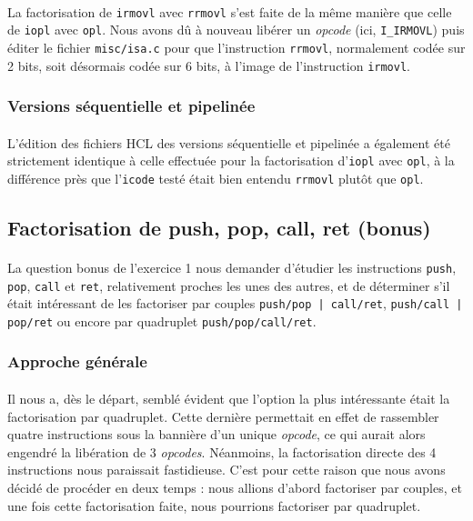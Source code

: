 \documentclass[12pt]{article}
\begin{document}
\paragraph{}La factorisation de \verb+irmovl+ avec \verb+rrmovl+ s'est faite de la même manière que celle de \verb+iopl+ avec \verb+opl+. Nous avons dû à nouveau libérer un {\itshape opcode} (ici, \verb+I_IRMOVL+) puis  éditer le fichier \verb+misc/isa.c+ pour que l'instruction \verb+rrmovl+, normalement codée sur 2 bits, soit désormais codée sur 6 bits, à l'image de l'instruction \verb+irmovl+.

\subsubsection{Versions séquentielle et pipelinée}
\paragraph{}L'édition des fichiers HCL des versions séquentielle et pipelinée a également été strictement identique à celle effectuée pour la factorisation d'\verb+iopl+ avec \verb+opl+, à la différence près que l'\verb+icode+ testé était bien entendu \verb+rrmovl+ plutôt que \verb+opl+.



\subsection{Factorisation de push, pop, call, ret (bonus)}
\paragraph{}La question bonus de l'exercice 1 nous demander d'étudier les instructions \verb+push+, \verb+pop+, \verb+call+ et \verb+ret+, relativement proches les unes des autres, et de déterminer s'il était intéressant de les factoriser par couples \verb+push/pop | call/ret+, \verb+push/call | pop/ret+ ou encore par quadruplet \verb+push/pop/call/ret+.

\subsubsection{Approche générale}
\paragraph{}Il nous a, dès le départ, semblé évident que l'option la plus intéressante était la factorisation par quadruplet. Cette dernière permettait en effet de rassembler quatre instructions sous la bannière d'un unique {\itshape opcode}, ce qui aurait alors engendré la libération de 3 {\itshape opcodes}. Néanmoins, la factorisation directe des 4 instructions nous paraissait fastidieuse. C'est pour cette raison que nous avons décidé de procéder en deux temps : nous allions d'abord factoriser par couples, et une fois cette factorisation faite, nous pourrions factoriser par quadruplet.
\end{document}
